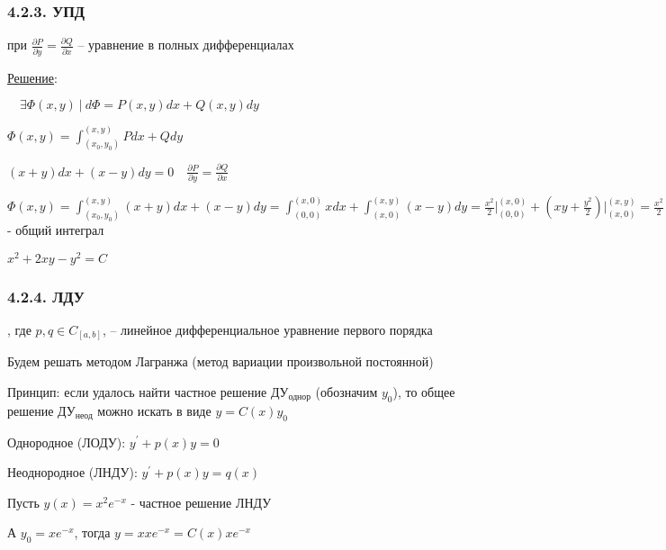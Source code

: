 \documentclass[12pt]{article}
\begin{document}
    \hypertarget{equationincompletedifferentials}{}

    \subsubsection{4.2.3. УПД}

    \Def {} при $\frac{\partial P}{\partial y} = \frac{\partial Q}{\partial x}$ -- уравнение в полных дифференциалах

    \underline{Решение}: 
    
    \Mems {} $\quad \exists \Phi(x, y)\ | \ d\Phi = P(x, y)dx + Q(x, y)dy$

    $\Phi(x, y) = \int^{(x,y)}_{(x_0,y_0)} Pdx + Qdy$

    \Ex $(x + y)dx + (x - y)dy = 0 \quad \frac{\partial P}{\partial y} = \frac{\partial Q}{\partial x}$

    $\Phi(x, y) = \int^{(x, y)}_{(x_0,y_0)} (x + y)dx + (x - y)dy =
    \int^{(x,0)}_{(0,0)} xdx + \int^{(x,y)}_{(x,0)} (x - y)dy = \frac{x^2}{2} \Big|_{(0, 0)}^{(x, 0)} +
    \left(xy + \frac{y^2}{2}\right) \Big|_{(x, 0)}^{(x, y)} = \frac{x^2}{2} + xy - \frac{y^2}{2} + C$ - общий интеграл

    $x^2 + 2xy - y^2 = C$

    \mediumvspace

    \hypertarget{lineardifferentialequation}{}

    \subsubsection{4.2.4. ЛДУ}

    \Def {}, где $p, q \in C_{[a, b]}$, -- линейное дифференциальное уравнение первого порядка

    \hypertarget{methodLagrange}{}

    \Nota Будем решать методом Лагранжа (метод вариации произвольной постоянной)

    Принцип: если удалось найти частное решение ДУ$_\text{однор}$ (обозначим $y_0$), то общее решение ДУ$_\text{неод}$
    можно искать в виде $y = C(x)y_0$

    \Def Однородное (ЛОДУ): $y^\prime + p(x)y = 0$

    \Defs Неоднородное (ЛНДУ): $y^\prime + p(x)y = q(x)$

    \Ex Пусть $y(x) = x^2 e^{-x}$ - частное решение ЛНДУ

    А $y_0 = x e^{-x}$, тогда $y = x xe^{-x} = C(x) x e^{-x}$
\end{document}
